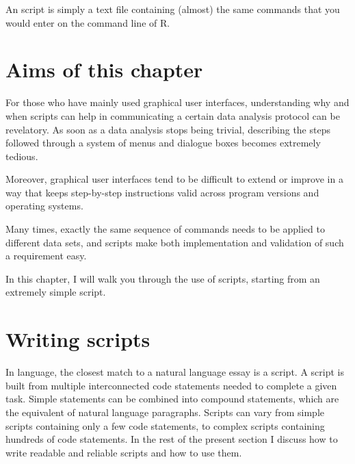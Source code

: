 \documentclass[krantz2]{krantz}\usepackage{knitr}
\newcommand{\href}[2]{\emph{#2} (\url{#1})}
\begin{document}
\begin{VF}
An \Rlang script is simply a text file containing (almost) the same commands that you would enter on the command line of R.

\nocite{LemonND}
\end{VF}


\section{Aims of this chapter}

For those who have mainly used graphical user interfaces, understanding why and when scripts can help in communicating a certain data analysis protocol can be revelatory. As soon as a data analysis stops being trivial, describing the steps followed through a system of menus and dialogue boxes becomes extremely tedious.

Moreover, graphical user interfaces tend to be difficult to extend or improve in a way that keeps step-by-step instructions valid across program versions and operating systems.

Many times, exactly the same sequence of commands needs to be applied to different data sets, and scripts make both implementation and validation of such a requirement easy.

In this chapter, I will walk you through the use of \Rpgrm scripts, starting from an extremely simple script.

\section{Writing scripts}

In \Rlang language, the closest match to a natural language essay is a script. A script is built from multiple interconnected code statements needed to complete a given task. Simple statements can be combined into compound statements, which are the equivalent of natural language paragraphs. Scripts can vary from simple scripts containing only a few code statements, to complex scripts containing hundreds of code statements. In the rest of the present section I discuss how to write readable and reliable scripts and how to use them.
\end{document}
